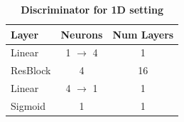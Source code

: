 \documentclass[10pt,twocolumn,letterpaper]{article}
\begin{document}


\begin{table}[ht]
\caption{\textbf{Discriminator for 1D setting}} %
\centering %
\begin{tabular}{l c c}
\toprule
\textbf{Layer} & \textbf{Neurons} & \textbf{Num Layers} \\ \midrule
Linear & 1 $\rightarrow$ 4 & 1  \\ %
ResBlock & 4 & 16 \\ 
Linear & 4 $\rightarrow$ 1 & 1 \\
Sigmoid & 1 & 1 \\
\bottomrule %
\end{tabular}
\label{table:1d_D} %
\end{table}
\end{document}
